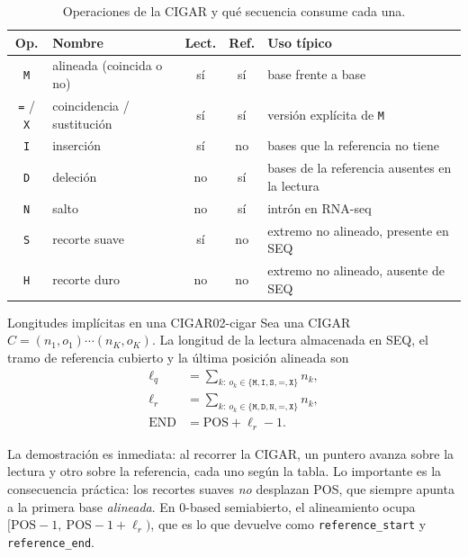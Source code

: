 \begin{table}[t]
\centering\small
\caption{Operaciones de la CIGAR y qué secuencia consume cada una.}
\label{tab:02-cigar}
\begin{tabularx}{\linewidth}{@{}clccX@{}}
\toprule
\textbf{Op.} & \textbf{Nombre} & \textbf{Lect.} & \textbf{Ref.} & \textbf{Uso típico}\\
\midrule
\texttt{M} & alineada (coincida o no) & sí & sí & base frente a base\\
\texttt{=} / \texttt{X} & coincidencia / sustitución & sí & sí & versión explícita de \texttt{M}\\
\texttt{I} & inserción & sí & no & bases que la referencia no tiene\\
\texttt{D} & deleción & no & sí & bases de la referencia ausentes en la lectura\\
\texttt{N} & salto & no & sí & intrón en RNA-seq\\
\texttt{S} & recorte suave & sí & no & extremo no alineado, presente en SEQ\\
\texttt{H} & recorte duro & no & no & extremo no alineado, ausente de SEQ\\
\bottomrule
\end{tabularx}
\end{table}

\begin{teorema}{Longitudes implícitas en una CIGAR}{02-cigar}
Sea una CIGAR $C = (n_1,o_1)\cdots(n_K,o_K)$. La longitud de la lectura almacenada en SEQ, el tramo de referencia cubierto y la última posición alineada son
\begin{align}
\ell_q &= \sum_{k:\ o_k \in \{\texttt{M},\texttt{I},\texttt{S},\texttt{=},\texttt{X}\}} n_k, \label{eq:02-lq}\\
\ell_r &= \sum_{k:\ o_k \in \{\texttt{M},\texttt{D},\texttt{N},\texttt{=},\texttt{X}\}} n_k, \label{eq:02-lr}\\
\mathrm{END} &= \mathrm{POS} + \ell_r - 1. \label{eq:02-end}
\end{align}
\end{teorema}
\begin{simbolos}
\end{simbolos}
La demostración es inmediata: al recorrer la CIGAR, un puntero avanza sobre la lectura y otro sobre la referencia, cada uno según la tabla. Lo importante es la consecuencia práctica: los recortes suaves \emph{no} desplazan POS, que siempre apunta a la primera base \emph{alineada}. En 0-based semiabierto, el alineamiento ocupa $[\mathrm{POS}-1,\ \mathrm{POS}-1+\ell_r)$, que es lo que devuelve  como \texttt{reference\_start} y \texttt{reference\_end}.

